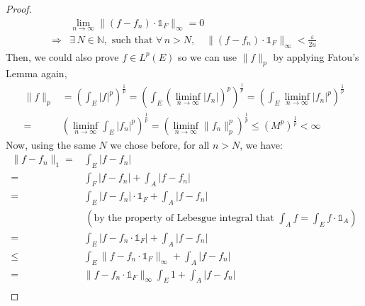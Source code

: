 \begin{answer}
\begin{proof}
        \begin{equation}
            \begin{aligned}
                &\lim_{n \to \infty} \lVert (f - f_n) \cdot \mathbb{1}_{F} \rVert_{\infty} = 0\\
                \Rightarrow & \exists\, N \in \mathbb{N}, \text{ such that } \forall\, n > N, \quad \lVert (f - f_n) \cdot \mathbb{1}_F \rVert_{\infty} < \tfrac{\varepsilon}{2u}
            \end{aligned}
        \end{equation}
        Then, we could also prove $f \in L^p(E)$ so we can use $\lVert f \rVert_p$ by applying Fatou's Lemma again,
        \begin{equation}
            \begin{aligned}
                \lVert f \rVert_p &= \left(\int_E \lvert f \rvert^p\right)^{\frac{1}{p}} = \left(\int_E (\liminf_{n \to \infty} \lvert f_n \rvert)^p\right)^{\frac{1}{p}} = \left(\int_E \liminf_{n \to \infty} \lvert f_n \rvert^p\right)^{\frac{1}{p}}\\
                = &\left(\liminf_{n \to \infty} \int_E \lvert f_n \rvert^p\right)^{\frac{1}{p}} = \left(\liminf_{n \to \infty} \lVert f_n \rVert_p^p\right)^{\frac{1}{p}} \leq (M^p)^{\frac{1}{p}} < \infty
            \end{aligned}
        \end{equation}
        Now, using the same $N$ we chose before, for all $n > N$, we have:
        \begin{equation}
            \begin{aligned}
                \lVert f - f_n \rVert_1 = &\int_E \lvert f - f_n \rvert\\
                = &\int_F \lvert f - f_n \rvert + \int_A \lvert f - f_n \rvert\\
                = &\int_E \lvert f - f_n \rvert \cdot \mathbb{1}_F + \int_A \lvert f - f_n\rvert\\
                &\, \left( \text{by the property of Lebesgue integral that $\int_A f = \int_E f \cdot \mathbb{1}_A$} \right)\\
                = &\int_E \lvert f - f_n \cdot \mathbb{1}_F \rvert + \int_A \lvert f - f_n\rvert\\
                \leq &\int_E \lVert f - f_n \cdot \mathbb{1}_F \rVert_{\infty} + \int_A \lvert f - f_n\rvert\\
                = &\lVert f - f_n \cdot \mathbb{1}_F \rVert_{\infty} \int_E 1 + \int_A \lvert f - f_n\rvert\\

\end{aligned}
\end{equation}
\end{proof}
\end{answer}
